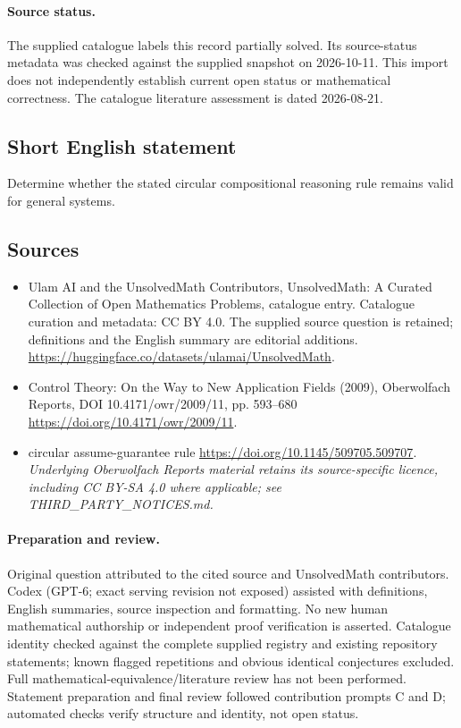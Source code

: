 \documentclass[11pt]{article}
\begin{document}
\paragraph{Source status.}
The supplied catalogue labels this record partially solved. Its source-status metadata was checked against the supplied snapshot on 2026-10-11. This import does not independently establish current open status or mathematical correctness. The catalogue literature assessment is dated 2026-08-21.
\subsection{Short English statement}
Determine whether the stated circular compositional reasoning rule remains valid for general systems.
\subsection{Sources}
\begin{itemize}
\item[S1] Ulam AI and the UnsolvedMath Contributors, UnsolvedMath: A Curated Collection of Open Mathematics Problems, catalogue entry. Catalogue curation and metadata: CC BY 4.0. The supplied source question is retained; definitions and the English summary are editorial additions.
\url{https://huggingface.co/datasets/ulamai/UnsolvedMath}.
\item[S2] Control Theory: On the Way to New Application Fields (2009), Oberwolfach Reports, DOI 10.4171/owr/2009/11, pp. 593--680
\url{https://doi.org/10.4171/owr/2009/11}.
\item[S3] circular assume-guarantee rule
\url{https://doi.org/10.1145/509705.509707}.
\textit{Underlying Oberwolfach Reports material retains its source-specific licence, including CC BY-SA 4.0 where applicable; see THIRD\_PARTY\_NOTICES.md.}
\end{itemize}
\paragraph{Preparation and review.}
Original question attributed to the cited source and UnsolvedMath contributors. Codex (GPT-6; exact serving revision not exposed) assisted with definitions, English summaries, source inspection and formatting. No new human mathematical authorship or independent proof verification is asserted. Catalogue identity checked against the complete supplied registry and existing repository statements; known flagged repetitions and obvious identical conjectures excluded. Full mathematical-equivalence/literature review has not been performed. Statement preparation and final review followed contribution prompts C and D; automated checks verify structure and identity, not open status.
\label{end:statement}
\end{document}
